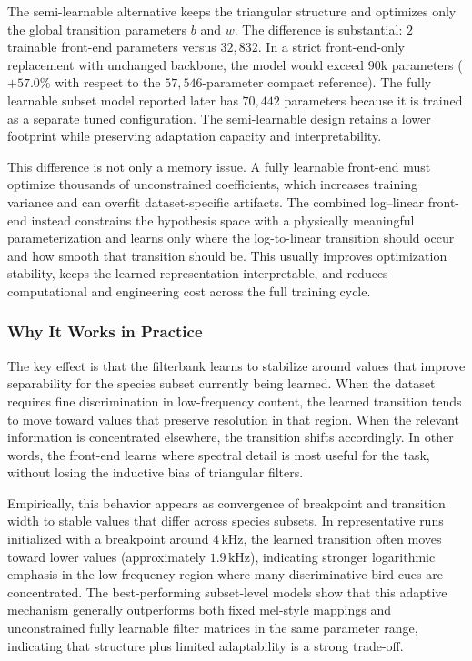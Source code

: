 \documentclass[a4paper,singleside,12pt]{report} %
\begin{document}
	The semi-learnable alternative keeps the triangular structure and optimizes only the global transition parameters \(b\) and \(w\). The difference is substantial: \(2\) trainable front-end parameters versus \(32{,}832\). In a strict front-end-only replacement with unchanged backbone, the model would exceed \(90\)k parameters (\(+57.0\%\) with respect to the \(57{,}546\)-parameter compact reference). The fully learnable subset model reported later has \(70{,}442\) parameters because it is trained as a separate tuned configuration. The semi-learnable design retains a lower footprint while preserving adaptation capacity and interpretability.

	This difference is not only a memory issue. A fully learnable front-end must optimize thousands of unconstrained coefficients, which increases training variance and can overfit dataset-specific artifacts. The combined log--linear front-end instead constrains the hypothesis space with a physically meaningful parameterization and learns only where the log-to-linear transition should occur and how smooth that transition should be. This usually improves optimization stability, keeps the learned representation interpretable, and reduces computational and engineering cost across the full training cycle.

	\subsubsection{Why It Works in Practice}
	The key effect is that the filterbank learns to stabilize around values that improve separability for the species subset currently being learned. When the dataset requires fine discrimination in low-frequency content, the learned transition tends to move toward values that preserve resolution in that region. When the relevant information is concentrated elsewhere, the transition shifts accordingly. In other words, the front-end learns where spectral detail is most useful for the task, without losing the inductive bias of triangular filters.

	Empirically, this behavior appears as convergence of breakpoint and transition width to stable values that differ across species subsets. In representative runs initialized with a breakpoint around \(4\,\mathrm{kHz}\), the learned transition often moves toward lower values (approximately \(1.9\,\mathrm{kHz}\)), indicating stronger logarithmic emphasis in the low-frequency region where many discriminative bird cues are concentrated. The best-performing subset-level models show that this adaptive mechanism generally outperforms both fixed mel-style mappings and unconstrained fully learnable filter matrices in the same parameter range, indicating that structure plus limited adaptability is a strong trade-off.
\end{document}

